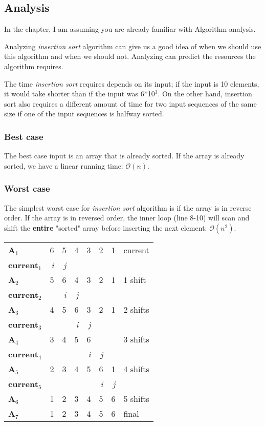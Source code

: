 \documentclass[11pt]{article}
\begin{document}
\subsection{Analysis}
\label{sec-2-1}
In the chapter, I am assuming you are already familiar with Algorithm analysis.

Analyzing \emph{insertion sort} algorithm can give us a good idea of when we should
use this algorithm and when we should not. Analyzing can predict the resources
the algorithm requires.

The time \emph{insertion sort} requires depends on its input; if the input is 10
elements, it would take shorter than if the input was 6*10$^{\text{3}}$. On the other hand,
insertion sort also requires a different amount of time for two input sequences of the same
size if one of the input sequences is halfway sorted.

\subsubsection{Best case}
\label{sec-2-1-1}
The best case input is an array that is already sorted. If the array is already
sorted, we have a linear running time: $\mathcal{O}(n)$.


\subsubsection{Worst case}
\label{sec-2-1-2}
The simplest worst case for \emph{insertion sort} algorithm is if the array is in
reverse order. If the array is in reversed order, the inner loop (line 8-10)
will scan and shift the \textbf{entire} "sorted" array before inserting the next
element: $\mathcal{O}(n^2)$.

\begin{center}
\begin{tabular}{lrrrrrrl}
\textbf{A$_{\text{1}}$} & 6 & 5 & 4 & 3 & 2 & 1 & current\\
\textbf{current$_{\text{1}}$} & \emph{i} & \emph{j} &  &  &  &  & \\
\textbf{A$_{\text{2}}$} & 5 & 6 & 4 & 3 & 2 & 1 & 1 shift\\
\textbf{current$_{\text{2}}$} &  & \emph{i} & \emph{j} &  &  &  & \\
\textbf{A$_{\text{3}}$} & 4 & 5 & 6 & 3 & 2 & 1 & 2 shifts\\
\textbf{current$_{\text{3}}$} &  &  & \emph{i} & \emph{j} &  &  & \\
\textbf{A$_{\text{4}}$} & 3 & 4 & 5 & 6 &  &  & 3 shifts\\
\textbf{current$_{\text{4}}$} &  &  &  & \emph{i} & \emph{j} &  & \\
\textbf{A$_{\text{5}}$} & 2 & 3 & 4 & 5 & 6 & 1 & 4 shifts\\
\textbf{current$_{\text{5}}$} &  &  &  &  & \emph{i} & \emph{j} & \\
\textbf{A$_{\text{6}}$} & 1 & 2 & 3 & 4 & 5 & 6 & 5 shifts\\
\textbf{A$_{\text{7}}$} & 1 & 2 & 3 & 4 & 5 & 6 & final\\
\end{tabular}
\end{center}
\end{document}
